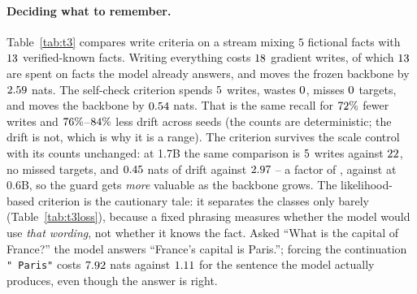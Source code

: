 \documentclass[11pt]{article}
\begin{document}
\paragraph{Deciding what to remember.} Table~\ref{tab:t3} compares write
criteria on a stream mixing $5$ fictional facts with $13$ verified-known facts.
Writing everything costs $18$ gradient writes, of which
$13$ are spent on facts the model already answers, and moves the
frozen backbone by $2.59$ nats. The self-check criterion spends
$5$ writes, wastes $0$, misses $0$ targets, and moves the backbone by $0.54$ nats. That is the same recall for
$72\%$ fewer writes and $76\%$--$84\%$
less drift across \tSelfSeeds{} seeds (the counts are deterministic; the drift is
not, which is why it is a range). The criterion survives the scale control with its counts
unchanged: at 1.7B the same comparison is $5$ writes against
$22$, no missed targets, and $0.45$ nats of drift against
$2.97$ -- a factor of \tLargeKlRatio{}, against \tSelfKlRatio{}
at 0.6B, so the guard gets \emph{more} valuable as the backbone grows. The likelihood-based
criterion is the cautionary
tale:
it separates the classes only barely (Table~\ref{tab:t3loss}), because a fixed
phrasing measures whether the model would use \emph{that wording}, not whether it
knows the fact. Asked ``What is the capital of France?'' the model answers
``France's capital is Paris.''; forcing the continuation \texttt{" Paris"} costs
$7.92$ nats against $1.11$ for the sentence the model
actually produces, even though the answer is right.
\end{document}
